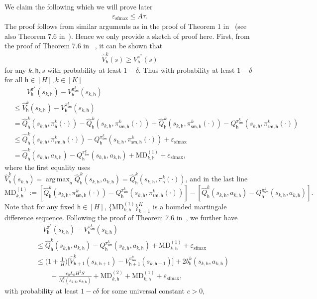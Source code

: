 \documentclass[10pt]{article}
\newcommand{\eps}{\varepsilon}
\DeclareMathOperator*{\argmax}{arg\,max}
\newcommand{\<}{\left\langle}
\renewcommand{\>}{\right\rangle}
\newcommand{\temp}{{\tau}}
\newcommand{\state}{{s}}
\newcommand{\action}{{a}}
\newcommand{\plc}{{\pi}}
\newcommand{\optplc}{{\pi^*}}
\newcommand{\Numepi}{{K}}
\newcommand{\horizon}{{H}}
\renewcommand{\horizon}{{H}}
\newcommand{\bonus}{{b}}
\newcommand{\valuefun}{{V}}
\newcommand{\Numst}{{S}}
\newcommand{\Numact}{{A}}
\newcommand{\Numvi}{{N}}
\newcommand{\Qfun}{{Q}}
\newcommand{\trestQfun}{{\widehat{\Qfun}}}
\newcommand{\Vfun}{{\valuefun}}
\newcommand{\trestVfun}{{\widehat{\Vfun}}}
\newcommand{\s}{{\mathsf{sm}}}
\newcommand{\epstemp}{{\eps_{\mathrm{sfmax}}}}
\newcommand{\MD}{{\mathrm{MD}}}
\def\sh{{\mathsf{h}}}
\begin{document}
We claim the following which we will prove later
\begin{align}\label{eq:epstemp_control}
  \epstemp\leq \Numact\temp.
\end{align}
The proof follows from similar arguments as in the proof of Theorem 1 in~\cite{azar2017minimax} (see also Theorem 7.6 in~\cite{agarwal2019reinforcement}). Hence we only provide a sketch of proof here.
First, from the proof of Theorem 7.6 in~\cite{agarwal2019reinforcement} , it can be shown that
\begin{align*}
 \trestVfun_\sh^k(\state)\geq\Vfun^{\optplc}_\sh(\state)
\end{align*}
for any $k,\sh,\state$ with probability at least $1-\delta$.
Thus with probability at least $1-\delta$ for all $\sh\in[\horizon],k\in[\Numepi]$
\begin{align*}
&\qquad\Vfun_\sh^{\optplc}(\state_{k,\sh})- \Vfun^{\plc^k_\s}_\sh(\state_{k,\sh})  \\
&\leq
\trestVfun^k_\sh(\state_{k,\sh})- \Vfun^{\plc^k_\s}_\sh(\state_{k,\sh})  \\
&=\trestQfun^k_\sh(\state_{k,\sh},\plc^k_{\sh}(\cdot))-\trestQfun^k_\sh(\state_{k,\sh},\plc^k_{\s,\sh}(\cdot))+\trestQfun^k_\sh(\state_{k,\sh},\plc^k_{\s,\sh}(\cdot))-
\Qfun^{\plc^k_\s}_\sh(\state_{k,\sh},\plc^k_{\s,\sh}(\cdot))\\
&\leq
\trestQfun^k_\sh(\state_{k,\sh},\plc^k_{\s,\sh}(\cdot))-
\Qfun^{\plc^k_\s}_\sh(\state_{k,\sh},\plc^k_{\s,\sh}(\cdot))+\epstemp\\
&=
\trestQfun^k_\sh(\state_{k,\sh},\action_{k,\sh})-
\Qfun^{\plc^k_\s}_\sh(\state_{k,\sh},\action_{k,\sh})+\MD^{(1)}_{k,\sh}+\epstemp,
\end{align*}
where the first equality uses $\trestVfun^k_\sh(\state_{k,\sh})=\argmax_{\action}\trestQfun^k_\sh(\state_{k,\sh},\action_{k,\sh})=\trestQfun^k_\sh(\state_{k,\sh},\plc_\sh^k(\cdot))$, and in the last line $$
\MD^{(1)}_{k,\sh}:=[\trestQfun^k_\sh(\state_{k,\sh},\plc^k_{\s,\sh}(\cdot))-
\Qfun^{\plc^k_\s}_\sh(\state_{k,\sh},\plc^k_{\s,\sh}(\cdot))]-[\trestQfun^k_\sh(\state_{k,\sh},\action_{k,\sh})-
\Qfun^{\plc^k_\s}_\sh(\state_{k,\sh},\action_{k,\sh})].
$$  Note that for any fixed $\sh\in[\horizon]$, $\{\MD^{(1)}_{k,\sh}\}_{k=1}^{\Numepi}$ is a bounded martingale difference sequence. Following  the proof of Theorem 7.6 in~\cite{agarwal2019reinforcement}, we further have
\begin{align*}
&\quad\Vfun_\sh^{\optplc}(\state_{k,\sh})- \Vfun^{\plc^k_\s}_\sh(\state_{k,\sh})\\
&\leq \trestQfun^k_\sh(\state_{k,\sh},\action_{k,\sh})-
\Qfun^{\plc^k_\s}_\sh(\state_{k,\sh},\action_{k,\sh})+
\MD^{(1)}_{k,\sh}+\epstemp\\
&\leq
\Big(1+\frac{1}\horizon\Big)\Big[\trestVfun_{\sh+1}^k(\state_{k,\sh+1})- \Vfun^{\plc^k_\s}_{\sh+1}(\state_{k,\sh+1})  \Big]+2\bonus_\sh^k(\state_{k,\sh},\action_{k,\sh})
\\
&\qquad+
\frac{c_0L_0\horizon^2\Numst}{\Numvi^k_\sh(\state_{k,\sh},\action_{k,\sh})}+\MD^{(2)}_{k,\sh}+\MD^{(1)}_{k,\sh}+\epstemp,
\end{align*}with probability at least $1-c\delta$ for some universal constant $c>0$,
\end{document}
